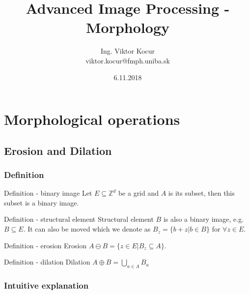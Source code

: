 \documentclass{beamer}
\title[7. cvičenie]{Advanced Image Processing - Morphology}
\author[Kocur]{Ing. Viktor Kocur \\{\small viktor.kocur@fmph.uniba.sk}}
\institute{DAI FMFI UK}
\date{6.11.2018}
\newcommand*{\Z}{\mathbb{Z}}
\begin{document}

\begin{frame}
  \titlepage
\end{frame}

\section{Morphological operations}
\subsection{Erosion and Dilation}

\begin{frame}
\frametitle{Definition}
  \begin{block}{Definition - binary image}
  Let $E \subseteq \Z^d$ be a grid and $A$ is its subset, then this subset is a binary image.
  \end{block}
  
  \begin{block}{Definition - structural element}
  Structural element $B$ is also a binary image, e.g. $B \subseteq E$. It can also be moved which we denote as  $B_z = \{b + z | b \in B\}$ for $\forall z \in E$.
  \end{block}

  \begin{block}{Definition - erosion}
  Erosion $A \ominus B = \{z \in E | B_z \subseteq A \}.$
  \end{block}
  
  \begin{block}{Definition - dilation}
  Dilation $A \oplus B = \bigcup_{a \in A} B_a$
  \end{block}
\end{frame}

\begin{frame}
\frametitle{Intuitive explanation} 
\noindent{}
\end{frame}
\end{document}
